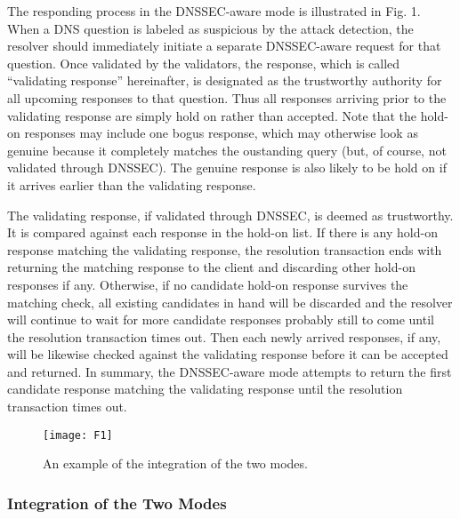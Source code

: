 \documentclass[conference]{IEEEtran}
\begin{document}
The responding process in the DNSSEC-aware mode is illustrated in Fig. 1. When a DNS question is labeled as suspicious by the attack detection, the resolver should immediately initiate a separate DNSSEC-aware request for that question. Once validated by the validators, the response, which is called ``validating response'' hereinafter, is designated as the trustworthy authority for all upcoming responses to that question. Thus all responses arriving prior to the validating response are simply hold on rather than accepted. Note that the hold-on responses may include one bogus response, which may otherwise look as genuine because it completely matches the oustanding query (but, of course, not validated through DNSSEC). The genuine response is also likely to be hold on if it arrives earlier than the validating response.


The validating response, if validated through DNSSEC, is deemed as trustworthy. It is compared against each response in the hold-on list. If there is any hold-on response matching the validating response, the resolution transaction ends with returning the matching response to the client and discarding other hold-on responses if any. Otherwise, if no candidate hold-on response survives the matching check, all existing candidates in hand will be discarded and the resolver will continue to wait for more candidate responses probably still to come until the resolution transaction times out. Then each newly arrived responses, if any, will be likewise checked against the validating response before it can be accepted and returned. In summary, the DNSSEC-aware mode attempts to return the first candidate response matching the validating response until the resolution transaction times out.

\begin{figure}[!t]
\centering
{\texttt{[image: F1]}}
\caption{An example of the integration of the two modes.}
\vspace{-2em}
\end{figure}

\subsubsection{Integration of the Two Modes}
\end{document}
